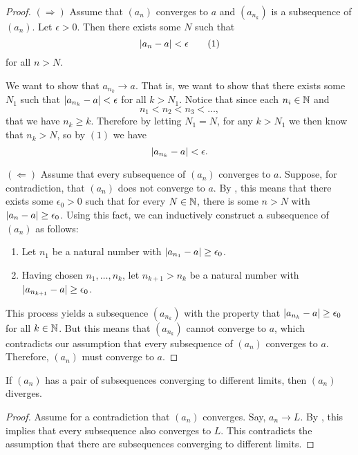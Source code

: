 \begin{proof}
  \phantom{.}

  $(\Rightarrow)$ Assume that $(a_n)$ converges to $a$ and $(a_{n_k})$ is a
  subsequence of $(a_n)$. Let $\epsilon > 0$. Then there exists some
  $N$ such that
  \[ | a_n - a | < \epsilon \tag{1} \]
  for all $n > N$.

  We want to show that $a_{n_k} \to a$. That is, we want to show that
  there exists some $N_1$ such that $| a_{n_k} - a | < \epsilon$ for
  all $k > N_1$. Notice that since each $n_i \in \mathbb N$ and
  \[ n_1 < n_2 < n_3 < \dots, \]
  that we have $n_k \geq k$. Therefore by letting $N_1 = N$, for any
  $k > N_1$ we then know that $n_k > N$, so by $(1)$ we have
  \[ | a_{n_k} - a | < \epsilon. \]

  $(\Leftarrow)$ Assume that every subsequence of $(a_n)$ converges
  to $a$. Suppose, for contradiction, that $(a_n)$ does not converge
  to $a$. By , this means that
  there exists some
  $\epsilon_0 > 0$ such that for every $N \in \mathbb N$, there is some $n > N$ with
  $| a_n - a | \geq \epsilon_0$. Using this fact, we can
  inductively construct a subsequence of
  $(a_n)$ as follows:
  \begin{enumerate}
    \item Let $n_1$ be a natural number with $| a_{n_1} - a | \geq
      \epsilon_0$.
    \item Having chosen $n_1, \dots, n_k$, let $n_{k+1} > n_k$
      be a natural number with $| a_{n_{k+1}} - a | \geq \epsilon_0$.
  \end{enumerate}

  This process yields a subsequence $(a_{n_k})$ with the property that
  $| a_{n_k} - a | \geq \epsilon_0$ for all $k \in \mathbb N$. But this
  means that $(a_{n_k})$ cannot converge to $a$, which contradicts
  our assumption that every subsequence of $(a_n)$ converges to $a$.
  Therefore, $(a_n)$ must converge to $a$.
\end{proof}

\begin{corollary}
  If $(a_n)$ has a pair of subsequences converging to different
  limits, then $(a_n)$ diverges.
\end{corollary}

\begin{proof}
  Assume for a contradiction that $(a_n)$ converges. Say, $a_n \to
  L$. By ,
  this implies that every subsequence also converges to $L$. This
  contradicts the
  assumption that there are subsequences converging to different limits.
\end{proof}


